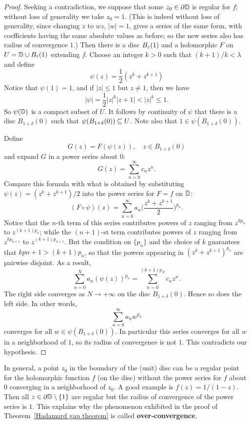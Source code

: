 \begin{proof}
Seeking a contradiction, we suppose that some $z_0\in\partial\mathbb{D}$ is regular for $f$; without loss of generality we take $z_0=1$. (This is indeed without loss of generality, since changing $z$ to $wz$, $|w|=1$, gives a series of the same form, with coefficients having the same absolute values as before; so the new series also has radius of convergence $1$.) Then there is a disc $B_{\varepsilon}(1)$ and a holomorphic $F$ on $U=\mathbb{D}\cup B_{\varepsilon}(1)$ extending $f$. Choose an integer $k>0$ such that $(k+1)/k<\lambda$ and define
\[\psi(z)=\frac{1}{2}(z^k+z^{k+1})\]
Notice that $\psi(1)=1$, and if $|z|\leq 1$ but $z\neq 1$, then we have
\[|\psi|=\frac{1}{2}|z|^k|z+1|<|z|^k\leq 1.\]
So $\psi(\mathbb{D})$ is a compact subset of $U$. It follows by continuity of $\psi$ that there is a disc $B_{1+\delta}(0)$ such that $\psi(B_{1+\delta}(0))\subseteq U$. Note also that $1\in\psi(B_{1+\delta}(0))$.\par
Define
\[G(z)=F(\psi(z)),\quad z\in B_{1+\delta}(0)\]
and expand $G$ in a power series about $0$:
\[G(z)=\sum_{n=0}^{\infty}c_nz^n.\]
Compare this formula with what is obtained by substituting $\psi(z)=(z^k+z^{k+1})/2$ into the power series for $F=f$ on $\mathbb{D}$:
\[(F\circ\psi)(z)=\sum_{n=0}^{\infty}a_n\Big(\frac{z^k+z^{k+1}}{2}\Big)^{p_n}.\]
Notice that the $n$-th term of this series contributes powers of $z$ ranging from $z^{kp_n}$ to $z^{(k+1)p_n}$; while the $(n+1)$-st term contributes powers of $z$ ranging from $z^{kp_{n+1}}$ to $z^{(k+1)p_{n+1}}$. But the condition on $\{p_n\}$ and the choice of $k$ guarantees that $kp{n+1}>(k+1)p_n$, so that the powers appearing in $(z^k+z^{k+1})^{p_n}$ are pairwise disjoint. As a result, 
\[\sum_{n=0}^{N}a_n(\psi(z))^{p_n}=\sum_{n=0}^{(k+1)p_N}c_{n}z^n.\]
The right side converges as $N\to+\infty$ on the disc $B_{1+\delta}(0)$. Hence so does the left side. In other words,
\[\sum_{n=0}^{\infty}a_nw^{p_n}\]
converges for all $w\in\psi(B_{1+\delta}(0))$. In particular this series converges for all $w$ in a neighborhood of $1$, so its radius of convergence is not $1$. This contradicts our hypothesis.
\end{proof}
In general, a point $z_0$ in the boundary of the (unit) disc can be a regular point for the holomorphic function $f$ (on the disc) without the power series for $f$ about $0$ converging in a neighborhood of $z_0$. A good example is $f(z)=1/(1-z)$. Then all $z\in\partial\mathbb{D}\setminus\{1\}$ are regular but the radius of convergence of the power series is $1$. This explains why the phenomenon exhibited in the proof of Theorem~\ref{Hadamard gap theorem} is called \textbf{over-convergence}.\par
